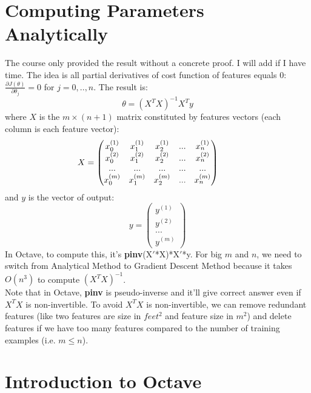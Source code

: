 \section{Computing Parameters Analytically}
The course only provided the result without a concrete proof. I will add if I have time. The idea is all partial derivatives of cost function of features equals 0: $\frac{\partial J(\theta)}{\partial \theta_j} = 0$ for $j=0,..,n$. The result is:
\[
\theta = (X^T X)^{-1}X^Ty
\]
where $X$ is the $m \times (n+1)$ matrix constituted by features vectors (each column is each feature vector):
\[
X = \begin{pmatrix}
x_0^{(1)} & x_1^{(1)} & x_2^{(1)} & ... & x_n^{(1)} \\
x_0^{(2)} & x_1^{(2)} & x_2^{(2)} & ... & x_n^{(2)} \\
...       & ...       & ...       & ... & ...\\
x_0^{(m)} & x_1^{(m)} & x_2^{(m)} & ... & x_n^{(m)}
\end{pmatrix} \hspace{0.8cm} 
\]
and $y$ is the vector of output:
\[
y = \begin{pmatrix}
y^{(1)} \\
y^{(2)} \\
... \\
y^{(m)}
\end{pmatrix}
\]
In Octave, to compute this, it's \textbf{pinv}(X$'$*X)*X$'$*y. For big $m$ and $n$, we need to switch from Analytical Method to Gradient Descent Method because it takes $O(n^3)$ to compute $(X^TX)^{-1}$. \\
Note that in Octave, \textbf{pinv} is pseudo-inverse and it'll give correct answer even if $X^TX$ is non-invertible. To avoid $X^TX$ is non-invertible, we can remove redundant features (like two features are size in $feet^2$ and feature size in $m^2$) and delete features if we have too many features compared to the number of training examples (i.e. $m \leq n$). 

\section{Introduction to Octave}
